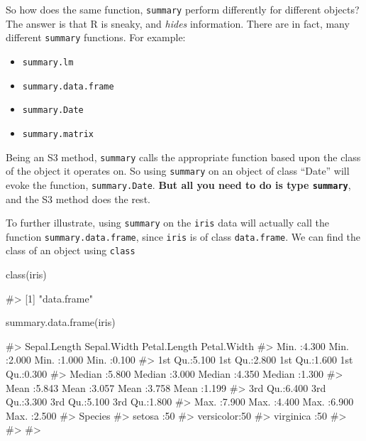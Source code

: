 So how does the same function, \texttt{summary} perform differently for
different objects? The answer is that R is sneaky, and \emph{hides}
information. There are in fact, many different \texttt{summary}
functions. For example:

\begin{itemize}
\itemsep1pt\parskip0pt
\item
  \texttt{summary.lm}
\item
  \texttt{summary.data.frame}
\item
  \texttt{summary.Date}
\item
  \texttt{summary.matrix}
\end{itemize}

Being an S3 method, \texttt{summary} calls the appropriate function
based upon the class of the object it operates on. So using
\texttt{summary} on an object of class ``Date'' will evoke the function,
\texttt{summary.Date}. \textbf{But all you need to do is type
\texttt{summary}}, and the S3 method does the rest.

To further illustrate, using \texttt{summary} on the \texttt{iris} data
will actually call the function \texttt{summary.data.frame}, since
\texttt{iris} is of class \texttt{data.frame}. We can find the class of
an object using \texttt{class}

\begin{Schunk}
\begin{Sinput}
class(iris)
\end{Sinput}
\begin{Soutput}
#> [1] "data.frame"
\end{Soutput}
\end{Schunk}

\begin{Schunk}
\begin{Sinput}
summary.data.frame(iris)
\end{Sinput}
\begin{Soutput}
#>   Sepal.Length    Sepal.Width     Petal.Length    Petal.Width   
#>  Min.   :4.300   Min.   :2.000   Min.   :1.000   Min.   :0.100  
#>  1st Qu.:5.100   1st Qu.:2.800   1st Qu.:1.600   1st Qu.:0.300  
#>  Median :5.800   Median :3.000   Median :4.350   Median :1.300  
#>  Mean   :5.843   Mean   :3.057   Mean   :3.758   Mean   :1.199  
#>  3rd Qu.:6.400   3rd Qu.:3.300   3rd Qu.:5.100   3rd Qu.:1.800  
#>  Max.   :7.900   Max.   :4.400   Max.   :6.900   Max.   :2.500  
#>        Species  
#>  setosa    :50  
#>  versicolor:50  
#>  virginica :50  
#>                 
#>                 
#> 
\end{Soutput}
\end{Schunk}

